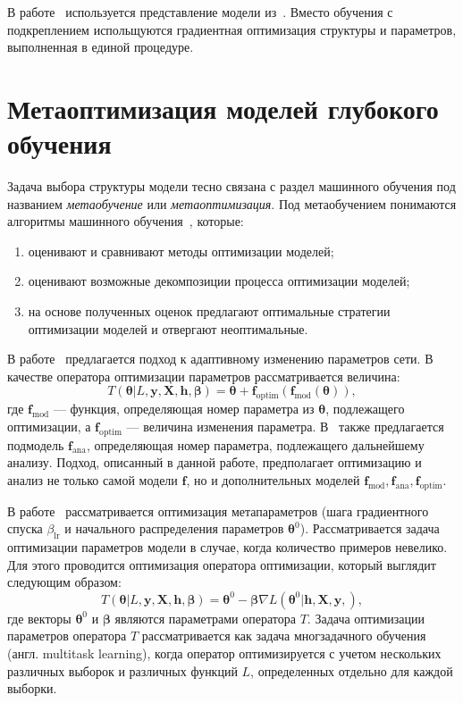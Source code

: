 В работе~\cite{darts} используется представление модели из~\cite{reinf_transfer}. Вместо обучения с подкреплением испольщуются градиентная оптимизация структуры и параметров, выполненная в единой процедуре.

\section{Метаоптимизация моделей глубокого обучения}
Задача выбора структуры модели тесно связана с раздел машинного обучения под названием \textit{метаобучение} или \textit{метаоптимизация}. Под метаобучением понимаются алгоритмы машинного обучения~\cite{metalearn}, которые:
\begin{enumerate}[1)]
\item оценивают и сравнивают методы оптимизации моделей;
\item оценивают возможные декомпозиции процесса оптимизации моделей;
\item на основе полученных оценок предлагают оптимальные стратегии оптимизации моделей и отвергают неоптимальные. 
\end{enumerate}

В работе~\cite{self_rnn} предлагается подход к адаптивному изменению параметров сети. В качестве оператора оптимизации параметров рассматривается величина:
\[
    T( \boldsymbol{\theta}| L, \mathbf{y}, \mathbf{X}, \mathbf{h}, \boldsymbol{\beta}) = \boldsymbol{\theta} + \mathbf{f}_\text{optim}(\mathbf{f}_\text{mod}( \boldsymbol{\theta})),
\]
где $\mathbf{f}_\text{mod}$ --- функция, определяющая номер параметра из $\boldsymbol{\theta}$, подлежащего оптимизации, а $ \mathbf{f}_\text{optim}$ --- величина изменения параметра. 
В~\cite{self_rnn} также предлагается подмодель $\mathbf{f}_\text{ana}$, определяющая номер параметра, подлежащего дальнейшему анализу. Подход, описанный в данной работе, предполагает оптимизацию и анализ не только самой модели $\mathbf{f}$, но и дополнительных моделей $\mathbf{f}_\text{mod}, \mathbf{f}_\text{ana}, \mathbf{f}_\text{optim}$.

В работе~\cite{meta_sgd} рассматривается оптимизация метапараметров (шага градиентного спуска $\beta_{\text{lr}}$ и начального распределения параметров $\boldsymbol{\theta}^0$). Рассматривается задача оптимизации параметров модели в случае, когда количество примеров невелико. Для этого проводится оптимизация оператора оптимизации, который выглядит следующим образом:
\[
    T(\boldsymbol{\theta}| L, \mathbf{y}, \mathbf{X},  \mathbf{h}, \boldsymbol{\beta})  = \boldsymbol{\theta}^0 - \boldsymbol{\beta}\nabla L(\boldsymbol{\theta}^0| \mathbf{h}, \mathbf{X}, \mathbf{y},),
\]
где векторы $\boldsymbol{\theta}^0$ и $\boldsymbol{\beta}$ являются параметрами оператора $T$. Задача оптимизации параметров оператора $T$ рассматривается как задача многзадачного обучения (англ. multitask learning), когда оператор оптимизируется с учетом нескольких различных выборок и различных функций $L$, определенных отдельно для каждой выборки.


